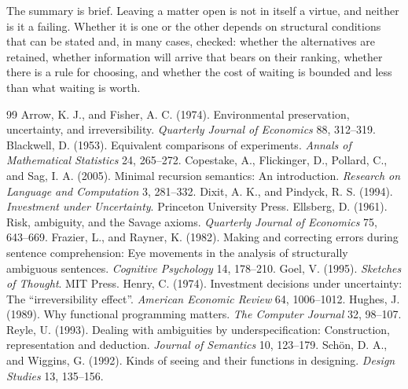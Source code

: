 \documentclass[11pt]{article}
\theoremstyle{remark}
\begin{document}
The summary is brief. Leaving a matter open is not in itself a virtue, and neither is it a failing. Whether it is one or the other depends on structural conditions that can be stated and, in many cases, checked: whether the alternatives are retained, whether information will arrive that bears on their ranking, whether there is a rule for choosing, and whether the cost of waiting is bounded and less than what waiting is worth.

\begin{thebibliography}{99}\small
{} Arrow, K. J., and Fisher, A. C. (1974). Environmental preservation, uncertainty, and irreversibility. \emph{Quarterly Journal of Economics} 88, 312--319.
 Blackwell, D. (1953). Equivalent comparisons of experiments. \emph{Annals of Mathematical Statistics} 24, 265--272.
 Copestake, A., Flickinger, D., Pollard, C., and Sag, I. A. (2005). Minimal recursion semantics: An introduction. \emph{Research on Language and Computation} 3, 281--332.
 Dixit, A. K., and Pindyck, R. S. (1994). \emph{Investment under Uncertainty}. Princeton University Press.
 Ellsberg, D. (1961). Risk, ambiguity, and the Savage axioms. \emph{Quarterly Journal of Economics} 75, 643--669.
 Frazier, L., and Rayner, K. (1982). Making and correcting errors during sentence comprehension: Eye movements in the analysis of structurally ambiguous sentences. \emph{Cognitive Psychology} 14, 178--210.
 Goel, V. (1995). \emph{Sketches of Thought}. MIT Press.
 Henry, C. (1974). Investment decisions under uncertainty: The ``irreversibility effect''. \emph{American Economic Review} 64, 1006--1012.
 Hughes, J. (1989). Why functional programming matters. \emph{The Computer Journal} 32, 98--107.
 Reyle, U. (1993). Dealing with ambiguities by underspecification: Construction, representation and deduction. \emph{Journal of Semantics} 10, 123--179.
 Sch\"on, D. A., and Wiggins, G. (1992). Kinds of seeing and their functions in designing. \emph{Design Studies} 13, 135--156.
\end{thebibliography}
\end{document}
